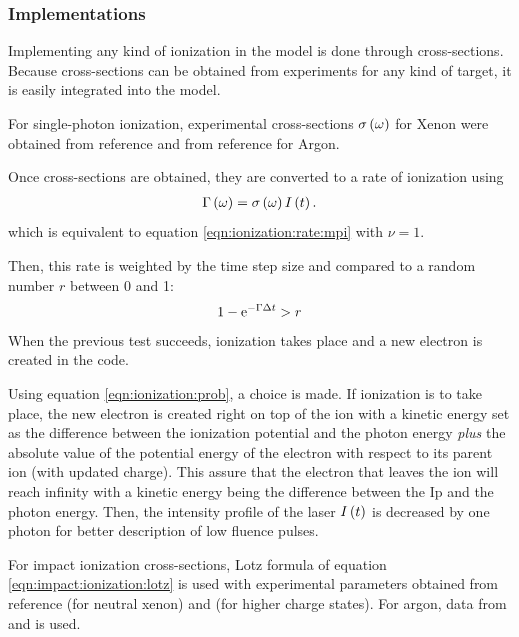 \subsubsection{Implementations}
\label{section:intro:md:implementation}


Implementing any kind of ionization in the model is done through cross-sections.
Because cross-sections can be obtained from experiments for any kind of target,
it is easily integrated into the model.


For single-photon ionization, experimental cross-sections $\sigma\left( \omega \right)$
for Xenon were obtained from reference \cite{West1978} and from
reference \cite{Marr1976} for Argon.

Once cross-sections are obtained, they are converted to a rate of ionization
using
\begin{align}
\Gamma\left( \omega \right) = \sigma\left( \omega \right) I\left( t \right).
\label{eqn:ionization:rate:single}
\end{align}
which is equivalent to equation \eqref{eqn:ionization:rate:mpi} with $\nu = 1$.

Then, this rate is weighted\cite{Lax2006} by the time step size and compared to
a random number $r$ between 0 and 1:
\begin{align}
1 - \textrm{e}^{-\Gamma \Delta t} > r
\label{eqn:ionization:prob}
\end{align}
When the previous test succeeds, ionization takes place and a new electron is
created in the code.

Using equation \eqref{eqn:ionization:prob}, a choice is made. If ionization is
to take place, the new electron is created right on top of the ion with a
kinetic energy set as the difference between the ionization potential and the
photon energy \textit{plus} the absolute value of the potential energy of the
electron with respect to its parent ion (with updated charge). This assure that
the electron that leaves the ion will reach infinity with a kinetic energy being
the difference between the Ip and the photon energy.
Then, the intensity profile of the laser $I\left( t \right)$ is decreased
by one photon for better description of low fluence pulses.

For impact ionization cross-sections, Lotz formula of equation
\eqref{eqn:impact:ionization:lotz} is used with experimental parameters obtained
from reference \cite{Tawara1987} (for neutral xenon) and \cite{Heidenreich2005}
(for higher charge states). For argon, data from \cite{Lotz1967} and
\cite{Lotz1970} is used.

